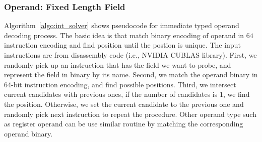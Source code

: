 
\subsubsection{Operand: Fixed Length Field}
Algorithm~\ref{algo:int_solver} shows pseudocode for immediate typed operand decoding process. 
The basic idea is that match binary encoding of operand in $64$ instruction encoding and find
position until the postion is unique. The input instructions are from disassembly code (i.e., NVIDIA CUBLAS library).
First, we randomly pick up an instruction that has the field we want to probe, and represent the field in binary by its 
name. Second, we match the operand binary in $64$-bit instruction encoding, and find possible positions. Third, we 
intersect current candidates with previous ones, if the number of candidates is $1$, we find the position. Otherwise, 
we set the current candidate to the previous one and randomly pick next instruction to repeat the procedure.
Other operand type such as register operand can be use similar routine by matching the corresponding operand binary.

